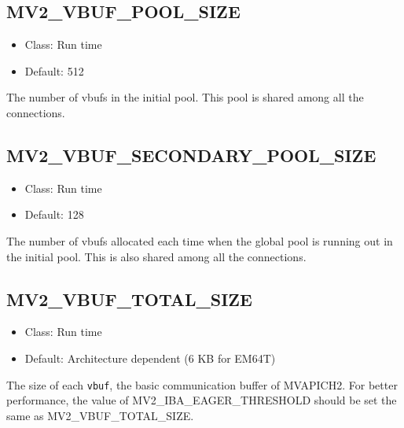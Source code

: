 \subsection{MV2\_VBUF\_POOL\_SIZE}
\label{def:nem-rdma-vbuf-pool-size}

\begin{itemize}
    \item Class: Run time
    \item Default: 512
\end{itemize}

The number of vbufs in the initial pool. This pool is shared among all
the connections.


\subsection{MV2\_VBUF\_SECONDARY\_POOL\_SIZE}
\label{def:nem-rdma-vbuf-secondary-pool-size}

\begin{itemize}
    \item Class: Run time
    \item Default: 128
\end{itemize}

The number of vbufs allocated each time when the global pool is running
out in the initial pool. This is also shared among all the connections.

\subsection{MV2\_VBUF\_TOTAL\_SIZE}
\label{def:nem-vbuf-total-size}

\begin{itemize}
    \item Class: Run time

    \item Default: Architecture dependent (6 KB for EM64T)
\end{itemize}

The size of each \texttt{vbuf}, the basic communication buffer of MVAPICH2.
For better performance, the value of MV2\_IBA\_EAGER\_THRESHOLD should be
set the same as MV2\_VBUF\_TOTAL\_SIZE.

%

